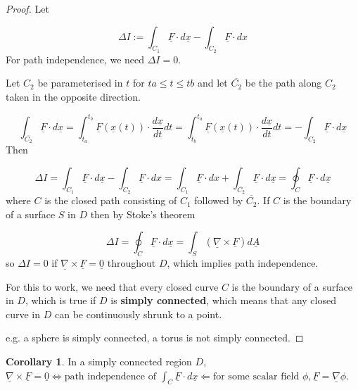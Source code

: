 \documentclass[12pt,a4paper]{article}
\theoremstyle{definition}
\newtheorem{corollary}[definition]{Corollary}
\begin{document}
\begin{proof}
	Let

	\[ \Delta I := \int_{C_1} \underline{F} \cdot d\underline{x} - \int_{C_2} \underline{F} \cdot dx \]
	For path independence, we need $\Delta I = 0$.

	Let $C_2$ be parameterised in $t$ for $ta \le t \le tb$ and let $\overline{C_2}$ be the path along $C_2$ taken in the opposite direction.

	\[ \int_{\overline{C_2}} \underline{F} \cdot d\underline{x} = \int_{t_a}^{t_b} \underline{F}(\underline{x}(t)) \cdot \frac{d\underline{x}}{dt} dt = \int_{t_b}^{t_a} \underline{F}(\underline{x}(t)) \cdot \frac{d\underline{x}}{dt} dt = -\int_{C_2} \underline{F} \cdot d\underline{x} \]
	Then
	
	\[ \Delta I = \int_{C_1} \underline{F} \cdot d\underline{x} - \int_{C_2} \underline{F} \cdot dx = \int_{C_1} \underline{F} \cdot dx + \int_{\overline{C_2}} \underline{F} \cdot d\underline{x} = \oint_C \underline{F} \cdot d\underline{x} \]
	where $C$ is the closed path consisting of $C_1$ followed by $\overline{C_2}$. If $C$ is the boundary of a surface $S$ in $D$ then by Stoke's theorem

	\[ \Delta I = \oint_C \underline{F} \cdot d\underline{x} = \int_S (\underline{\nabla} \times \underline{F}) d\underline{A} \]
	so $\Delta I = 0$ if $\underline{\nabla} \times \underline{F} = \underline{0}$ throughout $D$, which implies path independence.

	For this to work, we need that every closed curve $C$ is the boundary of a surface in $D$, which is true if $D$ is \textbf{simply connected}, which means that any closed curve in $D$ can be continuously shrunk to a point.

	e.g. a sphere is simply connected, a torus is not simply connected.
\end{proof}

\begin{corollary}
	In a simply connected region $D$, $\underline{\nabla} \times \underline{F} = \underline{0} \Leftrightarrow \text{path independence of } \int_C \underline{F} \cdot d\underline{x} \Leftarrow \text{for some scalar field } \phi, \underline{F} = \underline{\nabla} \phi$.
\end{corollary}
\end{document}
